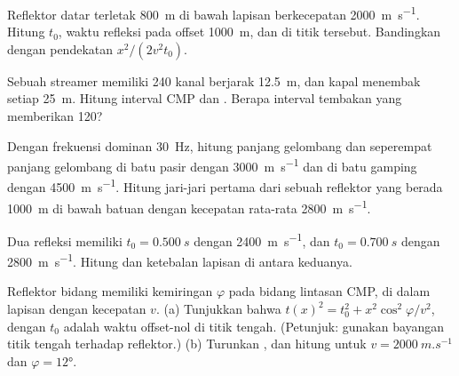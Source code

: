 \begin{exercise}[$\star$]\label{exo:b3:exploration-seismology:2}
Reflektor datar terletak \qty{800}{m} di bawah lapisan berkecepatan \qty{2000}{m.s^{-1}}.
Hitung $t_0$, waktu refleksi pada offset \qty{1000}{m}, dan 
di titik tersebut. Bandingkan dengan pendekatan $x^2/(2v^2t_0)$.
\end{exercise}

\begin{exercise}[$\star$]\label{exo:b3:exploration-seismology:3}
Sebuah streamer memiliki 240 kanal berjarak \qty{12.5}{m}, dan kapal menembak setiap
\qty{25}{m}. Hitung interval CMP dan . Berapa interval tembakan
yang memberikan  120?
\end{exercise}

\begin{exercise}[$\star$]\label{exo:b3:exploration-seismology:4}
Dengan frekuensi dominan \qty{30}{Hz}, hitung panjang gelombang dan
seperempat panjang gelombang di batu pasir dengan \qty{3000}{m.s^{-1}} dan di batu gamping dengan
\qty{4500}{m.s^{-1}}. Hitung jari-jari  pertama dari sebuah
reflektor yang berada \qty{1000}{m} di bawah batuan dengan kecepatan rata-rata \qty{2800}{m.s^{-1}}.
\end{exercise}

\begin{exercise}[$\star\star$]\label{exo:b3:exploration-seismology:5}
Dua refleksi memiliki $t_0 = \qty{0.500}{s}$ dengan 
\qty{2400}{m.s^{-1}}, dan $t_0 = \qty{0.700}{s}$ dengan \qty{2800}{m.s^{-1}}.
Hitung  dan ketebalan lapisan di antara keduanya.
\end{exercise}

\begin{exercise}[$\star\star$]\label{exo:b3:exploration-seismology:6}
Reflektor bidang memiliki kemiringan $\varphi$ pada bidang lintasan CMP, di dalam lapisan dengan
kecepatan $v$. (a) Tunjukkan bahwa $t(x)^2 = t_0^2 + x^2\cos^2\varphi/v^2$, dengan $t_0$ adalah
waktu offset-nol di titik tengah. (Petunjuk: gunakan bayangan titik tengah terhadap
reflektor.) (b) Turunkan , dan hitung untuk
$v = \qty{2000}{m.s^{-1}}$ dan $\varphi = \ang{12}$.
\end{exercise}

